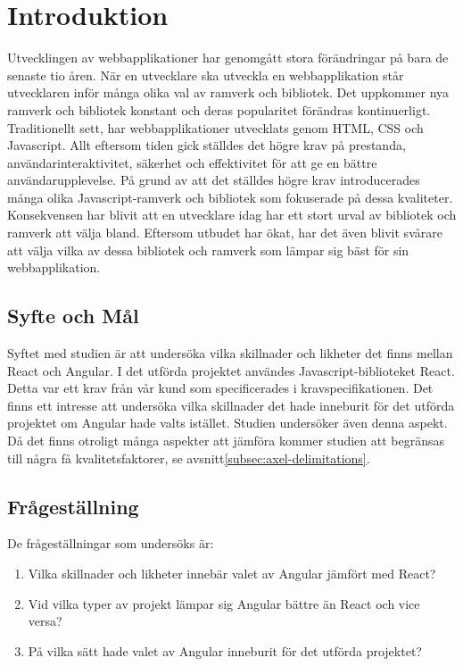 \section{Introduktion}
\label{sec:axel-introduction}
Utvecklingen av webbapplikationer har genomgått stora förändringar på bara de senaste tio åren. När en utvecklare ska utveckla en webbapplikation står utvecklaren inför många olika val av ramverk och bibliotek. Det uppkommer nya ramverk och bibliotek konstant och deras popularitet förändras kontinuerligt. Traditionellt sett, har webbapplikationer utvecklats genom HTML, CSS och Javascript. Allt eftersom tiden gick ställdes det högre krav på prestanda, användarinteraktivitet, säkerhet och effektivitet för att ge en bättre användarupplevelse. På grund av att det ställdes högre krav introducerades många olika Javascript-ramverk och bibliotek som fokuserade på dessa kvaliteter. Konsekvensen har blivit att en utvecklare idag har ett stort urval av bibliotek och ramverk att välja bland. Eftersom utbudet har ökat, har det även blivit svårare att välja vilka av dessa bibliotek och ramverk som lämpar sig bäst för sin webbapplikation.

\subsection{Syfte och Mål}
\label{subsec:motivation}

Syftet med studien är att undersöka vilka skillnader och likheter det finns mellan React och Angular. I det utförda projektet användes Javascript-biblioteket React. Detta var ett krav från vår kund som specificerades i kravspecifikationen. Det finns ett intresse att undersöka vilka skillnader det hade inneburit för det utförda projektet om Angular hade valts istället. Studien undersöker även denna aspekt. Då det finns otroligt många aspekter att jämföra kommer studien att begränsas till några få kvalitetsfaktorer, se avsnitt\ref{subsec:axel-delimitations}.

\subsection{Frågeställning}
\label{subsec:research-questions}

De frågeställningar som undersöks är:

\begin{enumerate}
\item\label{axel-fs:1} Vilka skillnader och likheter innebär valet av Angular jämfört med React?

\item\label{axel-fs:2} Vid vilka typer av projekt lämpar sig Angular bättre än React och vice versa?

\item\label{axel-fs:3} På vilka sätt hade valet av Angular inneburit för det utförda projektet?


\end{enumerate}


